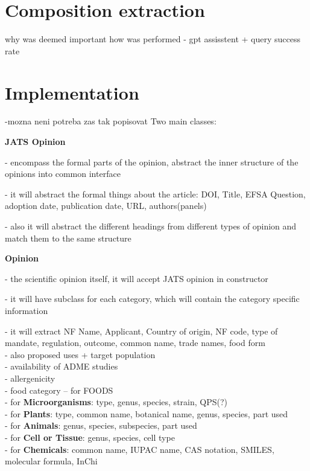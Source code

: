 \documentclass[12pt]{article}
\begin{document}
\section{Composition extraction}
why was deemed important
how was performed - gpt assisstent + query
success rate

\section{Implementation}
-mozna neni potreba zas tak popisovat
Two main classes:

\textbf{JATS Opinion}
 
- encompass the formal parts of the opinion, abstract the inner structure of the opinions into common interface

- it will abstract the formal things about the article: DOI, Title, EFSA Question, adoption date, publication date,
URL, authors(panels)

- also it will abstract the different headings from different types of opinion and match them to the same structure

\textbf{Opinion} 

- the scientific opinion itself, it will accept JATS opinion in constructor

- it will have subclass for each category, which will contain the category specific information

- it will extract NF Name, Applicant, Country of origin, NF code, type of mandate, regulation, outcome,
common name, trade names, food form\\
- also proposed uses + target population\\
- availability of ADME studies\\
- allergenicity\\
- food category -- for FOODS\\
- for \textbf{Microorganisms}: type, genus, species, strain, QPS(?)\\
- for \textbf{Plants}: type, common name, botanical name, genus, species, part used\\
- for \textbf{Animals}: genus, species, subspecies, part used\\
- for \textbf{Cell or Tissue}: genus, species, cell type\\
- for \textbf{Chemicals}: common name, IUPAC name, CAS notation, SMILES, molecular formula, InChi
\end{document}
